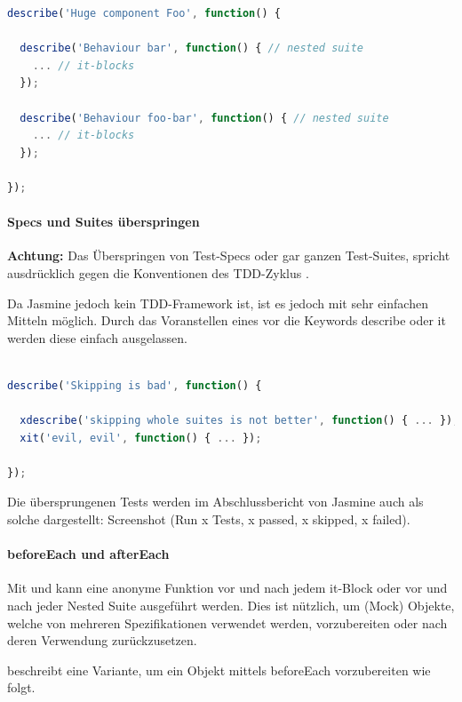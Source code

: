 {\begin{lstlisting}[language=JavaScript]
describe('Huge component Foo', function() {

  describe('Behaviour bar', function() { // nested suite
    ... // it-blocks
  });

  describe('Behaviour foo-bar', function() { // nested suite
    ... // it-blocks
  });

});
\end{lstlisting}

\paragraph{Specs und Suites überspringen}
\textbf{Achtung:} Das Überspringen von Test-Specs oder gar ganzen Test-Suites, spricht ausdrücklich gegen die Konventionen des TDD-Zyklus \autocite{Beck:2003}.

Da Jasmine jedoch kein TDD-Framework ist, ist es jedoch mit sehr einfachen Mitteln möglich. Durch das Voranstellen eines  vor die Keywords describe oder it werden diese einfach ausgelassen.

\begin{lstlisting}[language=JavaScript]

describe('Skipping is bad', function() {

  xdescribe('skipping whole suites is not better', function() { ... });
  xit('evil, evil', function() { ... });

});
\end{lstlisting}

Die übersprungenen Tests werden im Abschlussbericht von Jasmine auch als solche dargestellt:
Screenshot (Run x Tests, x passed, x skipped, x failed).

\paragraph{beforeEach und afterEach}

Mit  und  kann eine anonyme Funktion vor und nach jedem it-Block oder vor und nach jeder Nested Suite ausgeführt werden. Dies ist nützlich, um (Mock) Objekte, welche von mehreren Spezifikationen verwendet werden, vorzubereiten oder nach deren Verwendung zurückzusetzen.

\cite[23]{Hahn:2013} beschreibt eine Variante, um ein Objekt mittels beforeEach vorzubereiten wie folgt.
\begin{lstlisting}[language=JavaScript]


\end{lstlisting}}
